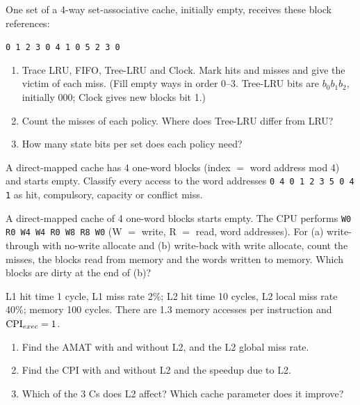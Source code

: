 \begin{exercise}\label{q:c-repl}
One set of a 4-way set-associative cache, initially empty, receives these block
references:
\begin{center}
\texttt{0 1 2 3 0 4 1 0 5 2 3 0}
\end{center}
\begin{enumerate}[label=(\alph*),leftmargin=*]
  \item Trace LRU, FIFO, Tree-LRU and Clock. Mark hits and misses and give the
  victim of each miss. (Fill empty ways in order 0--3. Tree-LRU bits are
  $b_0b_1b_2$, initially 000; Clock gives new blocks bit 1.)
  \item Count the misses of each policy. Where does Tree-LRU differ from LRU?
  \item How many state bits per set does each policy need?
\end{enumerate}
\end{exercise}

\begin{exercise}[The 3 Cs]\label{q:c-3c}
A direct-mapped cache has 4 one-word blocks (index $=$ word address mod 4) and
starts empty. Classify every access to the word addresses
\texttt{0 4 0 1 2 3 5 0 4 1} as hit, compulsory, capacity or conflict miss.
\end{exercise}

\begin{exercise}\label{q:c-write}
A direct-mapped cache of 4 one-word blocks starts empty. The CPU performs
\texttt{W0 R0 W4 W4 R0 W8 R8 W0} (W $=$ write, R $=$ read, word addresses). For
(a) write-through with no-write allocate and (b) write-back with write allocate,
count the misses, the blocks read from memory and the words written to memory.
Which blocks are dirty at the end of (b)?
\end{exercise}

\begin{exercise}\label{q:c-amat}
L1 hit time 1 cycle, L1 miss rate 2\%; L2 hit time 10 cycles, L2 local miss rate
40\%; memory 100 cycles. There are 1.3 memory accesses per instruction and
$\mathrm{CPI}_{exec}=1$.
\begin{enumerate}[label=(\alph*),leftmargin=*]
  \item Find the AMAT with and without L2, and the L2 global miss rate.
  \item Find the CPI with and without L2 and the speedup due to L2.
  \item Which of the 3 Cs does L2 affect? Which cache parameter does it improve?
\end{enumerate}
\end{exercise}

